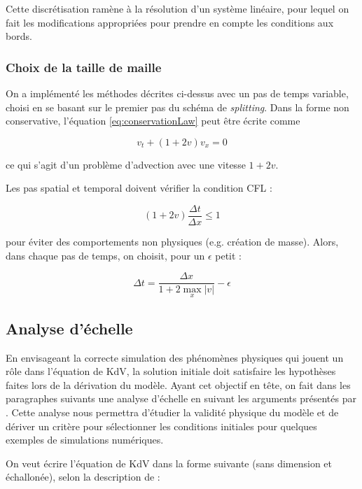 \indent Cette discrétisation ramène à la résolution d'un système linéaire, pour lequel on fait les modifications appropriées pour prendre en compte les conditions aux bords.

\subsubsection{Choix de la taille de maille}

\indent On a implémenté les méthodes décrites ci-dessus avec un pas de temps variable, choisi en se basant sur le premier pas du schéma de \emph{splitting}. Dans la forme non conservative, l'équation \eqref{eq:conservationLaw} peut être écrite comme

\begin{equation*}
v_t +  (1+2v)v_x = 0
\end{equation*}

\noindent ce qui s'agit d'un problème d'advection avec une vitesse $1+2v$.

\indent Les pas spatial et temporal doivent vérifier la condition CFL :

\begin{equation*}
(1+2v)\frac{\Delta t}{\Delta x} \leq 1
\end{equation*}

\noindent pour éviter des comportements non physiques (e.g. création de masse). Alors, dans chaque pas de temps, on choisit, pour un $\epsilon$ petit :

\begin{equation*}
\Delta t = \frac{\Delta x}{1+2\max\limits_{x}|v|} - \epsilon
\end{equation*}

\subsection{Analyse d'échelle}

\indent En envisageant la correcte simulation des phénomènes physiques qui jouent un rôle dans l'équation de KdV, la solution initiale doit satisfaire les hypothèses faites lors de la dérivation du modèle. Ayant cet objectif en tête, on fait dans les paragraphes suivants une analyse d'échelle en suivant les arguments présentés par \cite{BBM1971}. Cette analyse nous permettra d'étudier la validité physique du modèle et de dériver un critère pour sélectionner les conditions initiales pour quelques exemples de simulations numériques.

\indent On veut écrire l'équation de KdV dans la forme suivante (sans dimension et échallonée), selon la description de \cite{BBM1971} :

